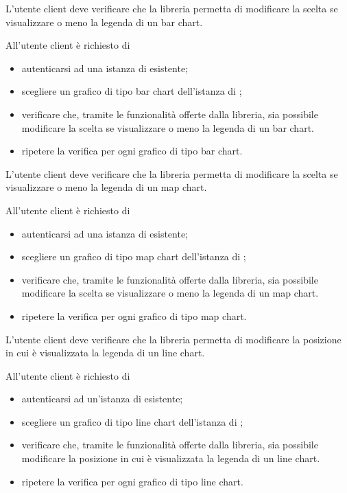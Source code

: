 	L'utente client deve verificare che la libreria permetta di modificare la scelta se visualizzare o meno la legenda di un bar chart.
		
		All'utente client è richiesto di
		\begin{itemize}
			\item autenticarsi ad una istanza di \projectname{} esistente;
			\item scegliere un grafico di tipo bar chart dell'istanza di \projectname{};
			\item verificare che, tramite le funzionalità offerte dalla libreria, sia possibile modificare la scelta se visualizzare o meno la legenda di un bar chart.
			\item ripetere la verifica per ogni grafico di tipo bar chart.
		\end{itemize}

	L'utente client deve verificare che la libreria permetta di modificare la scelta se visualizzare o meno la legenda di un map chart.
		
		All'utente client è richiesto di
		\begin{itemize}
			\item autenticarsi ad una istanza di \projectname{} esistente;
			\item scegliere un grafico di tipo map chart dell'istanza di \projectname{};
			\item verificare che, tramite le funzionalità offerte dalla libreria, sia possibile modificare la scelta se visualizzare o meno la legenda di un map chart.
			\item ripetere la verifica per ogni grafico di tipo map chart.
		\end{itemize}

	L'utente client deve verificare che la libreria permetta di modificare la posizione in cui è visualizzata la legenda di un line chart.
		
		All'utente client è richiesto di
		\begin{itemize}
			\item autenticarsi ad un'istanza di \projectname{} esistente;
			\item scegliere un grafico di tipo line chart dell'istanza di \projectname{};
			\item verificare che, tramite le funzionalità offerte dalla libreria, sia possibile modificare la posizione in cui è visualizzata la legenda di un line chart.
			\item ripetere la verifica per ogni grafico di tipo line chart.
		\end{itemize}

